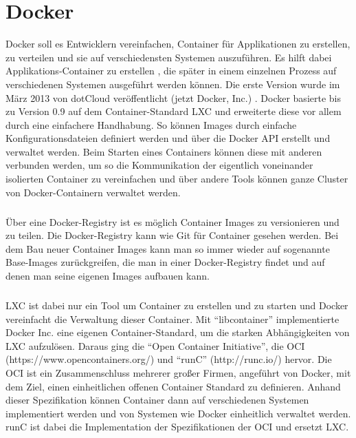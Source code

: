 \chapter{Docker}

Docker soll es Entwicklern vereinfachen, Container für Applikationen zu erstellen, zu verteilen und sie auf verschiedensten Systemen auszuführen. Es hilft dabei Applikations-Container zu erstellen \cite{docker}, die später in einem einzelnen Prozess auf verschiedenen Systemen ausgeführt werden können. Die erste Version wurde im März 2013 von dotCloud veröffentlicht (jetzt Docker, Inc.) \cite{docker:rel}.
Docker basierte bis zu Version 0.9 \cite{docker:cl} auf dem Container-Standard LXC und erweiterte diese vor allem durch eine einfachere Handhabung. So können Images durch einfache Konfigurationsdateien definiert werden und über die Docker API erstellt und verwaltet werden. Beim Starten eines Containers können diese mit anderen verbunden werden, um so die Kommunikation der eigentlich voneinander isolierten Container zu vereinfachen und über andere Tools können ganze Cluster von Docker-Containern verwaltet werden.

\paragraph{}
Über eine Docker-Registry ist es möglich Container Images zu versionieren und zu teilen. Die Docker-Registry kann wie Git für Container gesehen werden.  Bei dem Bau neuer Container Images kann man so immer wieder auf sogenannte Base-Images zurückgreifen, die man in einer Docker-Registry findet und auf denen man seine eigenen Images aufbauen kann.

\paragraph{}
LXC ist dabei nur ein Tool um Container zu erstellen und zu starten und Docker vereinfacht die Verwaltung dieser Container. Mit “libcontainer” implementierte Docker Inc. eine eigenen Container-Standard, um die starken Abhängigkeiten von LXC aufzulösen. Daraus ging die “Open Container Initiative”, die OCI (https://www.opencontainers.org/) und “runC” (http://runc.io/) hervor. Die OCI ist ein Zusammenschluss mehrerer großer Firmen, angeführt von Docker, mit dem Ziel, einen einheitlichen offenen Container Standard zu definieren. Anhand dieser Spezifikation können Container dann auf verschiedenen Systemen implementiert werden und von Systemen wie Docker einheitlich verwaltet werden. runC ist dabei die Implementation der Spezifikationen der OCI und ersetzt LXC.

